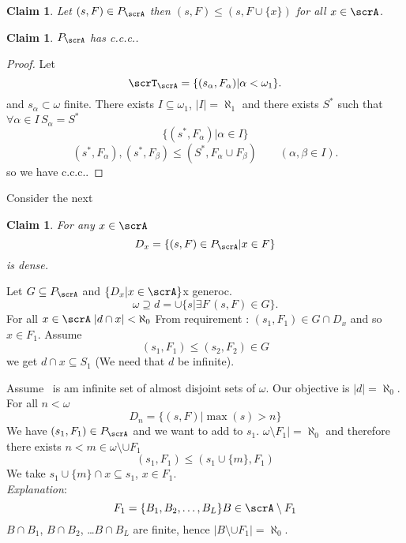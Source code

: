 \documentclass[11pt,pdftex,twoside,a4paper]{article}
\newcommand{\ccc}{c.c.c.}
\newtheorem{claim}[thm]{Claim}
\theoremstyle{definition}
\begin{document}
\begin{claim}
Let \((s,F)\in P_\scrA\)
then 
\((s,F)\leq (s,F\cup\{x\})\)
for all \(x\in\scrA\).
\end{claim}

\begin{claim}
\(P_\scrA\) has \ccc.
\end{claim}
\begin{proof}
Let 
\begin{equation*}
\scrT_\scrA = \{(s_\alpha, F_\alpha)|\alpha < \omega_1\}.
\end{equation*}
and \(s_\alpha \subset \omega\) finite.
There exists \(I \subseteq \omega_1\), \(|I| = \aleph_1\)
and there exists \(S^*\) such that \(\forall \alpha\in I\, S_\alpha=S^*\)
\begin{equation*}
\{(s^*,F_\alpha)| \alpha\in I\}
\end{equation*}
\begin{equation*}
(s^*,F_\alpha),(s^*,F_\beta) \leq (S^*,F_\alpha\cup F_\beta)
   \qquad (\alpha,\beta\in I).
\end{equation*}
so we have \ccc.
\end{proof}

Consider the next
\begin{claim}
For any \(x\in \scrA\)
\begin{equation*}
D_x = \{(s, F)\in P_\scrA | x\in F\}
\end{equation*}
is dense.
\end{claim}
Let \(G\subseteq P_\scrA\) and \(\{D_x|x\in\scrA\}\)x generoc.
\begin{equation*}
 \omega \supseteq d = \cup \{s|\exists F\,(s,F)\in G\}.
\end{equation*}
For all \(x\in \scrA \; |d\cap x| < \aleph_0\)
From requirement : \((s_1,F_1) \in G\cap D_x\) and so \(x\in F_1\).
Assume
\begin{equation*}
 (s_1,F_1) \leq (s_2,F_2) \in G
\end{equation*}
we get \(d\cap x\subseteq S_1\)
(We need that $d$ be infinite).

Assume \scrA\ is am infinite set of almost disjoint sets of \(\omega\).
Our objective is \(|d|=\aleph_0\).
For all \(n < \omega\)
\begin{equation*}
D_n = \{(s,F)| \max(s)>n\} %
\end{equation*}
We have \((s_1,F_1)\in P_\scrA\)
and we want to add to \(s_1\).
\(\omega \setminus F_1| = \aleph_0\) and therefore
there exists \(n < m \in \omega \setminus \cup F_1\)
\begin{equation*}
(s_1,F_1) \leq (s_1\cup\{m\}, F_1)
\end{equation*}
We take \(s_1\cup\{m\}\cap x \subseteq s_1\), \(x \in F_1\).
\\
\emph{Explanation}:
\begin{equation*}
 F_1 = \{B_1,B_2,\ldots, B_L\}\\
B \in \scrA \setminus F_1 \\
\end{equation*}
\(B\cap B_1\), \(B\cap B_2\), \ldots \(B\cap B_L\) are finite,
hence \(|B \setminus \cup F_1| = \aleph_0\).
\end{document}

